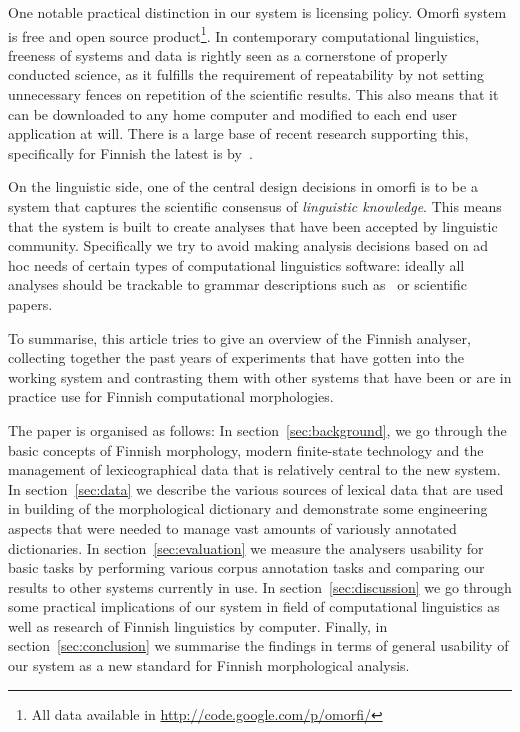 \documentclass[a4paper,12pt]{article}
\begin{document}
One notable practical distinction in our system is licensing policy. Omorfi
system is free and open source product\footnote{All data available in
\url{http://code.google.com/p/omorfi/}}.  In contemporary computational
linguistics, freeness of systems and data is rightly seen as a cornerstone of
properly conducted science, as it fulfills the requirement of repeatability by
not setting unnecessary fences on repetition of the scientific results. This
also means that it can be downloaded to any home computer and modified to each
end user application at will. There is a large base of recent research
supporting this, specifically for Finnish the latest is
by~\citet{koskenniemi2008build}.

On the linguistic side, one of the central design decisions in omorfi is to be
a system that captures the scientific consensus of \emph{linguistic knowledge}.
This means that the system is built to create analyses that have been accepted
by linguistic community. Specifically we try to avoid making analysis decisions
based on ad hoc needs of certain types of computational linguistics software:
ideally all analyses should be trackable to grammar descriptions such
as~\citet{visk} or scientific papers.

To summarise, this article tries to give an overview of the Finnish analyser,
collecting together the past years of experiments that have gotten into the
working system and contrasting them with other systems that have been or are
in practice use for Finnish computational morphologies.

The paper is organised as follows: In section~\ref{sec:background}, we go
through the basic concepts of Finnish morphology, modern finite-state
technology and the management of lexicographical data that is relatively
central to the new system. In section~\ref{sec:data} we describe the various
sources of lexical data that are used in building of the morphological
dictionary and demonstrate some engineering aspects that were needed to manage
vast amounts of variously annotated dictionaries. In
section~\ref{sec:evaluation} we measure the analysers usability for basic tasks
by performing various corpus annotation tasks and comparing our results to
other systems currently in use. In section~\ref{sec:discussion} we go
through some practical implications of our system in field of computational
linguistics as well as research of Finnish linguistics by computer. Finally,
in section~\ref{sec:conclusion} we summarise the findings in terms of general
usability of our system as a new standard for Finnish morphological analysis.
\end{document}
